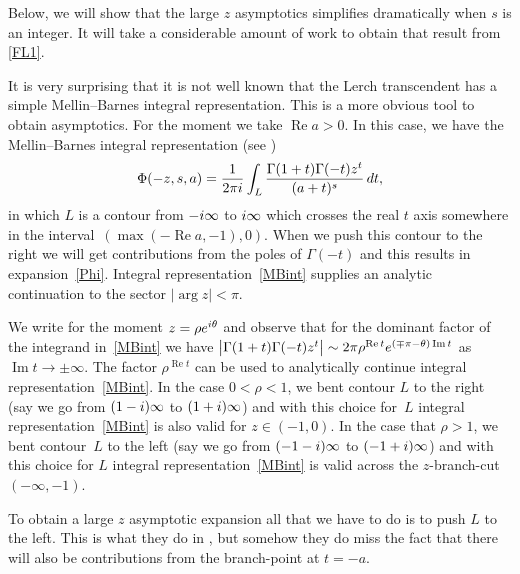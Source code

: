 \documentclass[11pt]{article}
\numberwithin{equation}{section}
\numberwithin{equation}{section}
\def\expe{{\rm e}}
\def\iunit{{\rm i}}
\def\id{\,{\rm d}}
\begin{document}
Below, we will show that the large $z$ asymptotics simplifies dramatically
when $s$ is an integer. It will take a considerable amount of work to
obtain that result from \eqref{FL1}.

It is very surprising that it is not well known that the Lerch transcendent has a simple
Mellin--Barnes integral representation. This is a more obvious tool to obtain asymptotics.
For the moment we take $\operatorname{Re} a>0$. In this case,
we have the Mellin--Barnes integral representation (see \cite[equation~(3.11)]{Srivastava2011})
\begin{equation}\label{MBint}
 \Phi(-z,s,a)=\frac1{2\pi\iunit}\int_L
 \frac{\Gamma(1+t)\Gamma(-t)z^t}{(a+t)^s}\id t,
\end{equation}
in which $L$ is a contour from $-\iunit\infty$ to $\iunit\infty$ which crosses the
real $t$ axis somewhere in the interval~$(\max(-\operatorname{Re} a,-1),0)$. When we push this contour to the
right we will get contributions from the poles of $\Gamma(-t)$ and this results in
expansion~\eqref{Phi}. Integral representation~\eqref{MBint} supplies an
analytic continuation to the sector $|\arg z|<\pi$.

We write for the moment $z=\rho\expe^{\iunit\theta}$ and observe that for the dominant factor
of the integrand in~\eqref{MBint} we have
$\bigl|\Gamma(1+t)\Gamma(-t)z^t\bigr|\sim 2\pi \rho^{\operatorname{Re} t}\expe^{(\mp\pi-\theta)\operatorname{Im} t}$
as $\operatorname{Im} t\to\pm\infty$. The factor $\rho^{\operatorname{Re} t}$ can be used to analytically continue
integral representation~\eqref{MBint}.
In the case $0<\rho<1$, we bent contour $L$ to the right (say we go from $(1-\iunit)\infty$
to $(1+\iunit)\infty$) and with this choice for~$L$ integral representation~\eqref{MBint} is also valid for $z\in(-1,0)$.
In the case that $\rho>1$, we bent contour~$L$ to the
left (say we go from $(-1-\iunit)\infty$ to $(-1+\iunit)\infty$) and
with this choice for $L$ integral representation~\eqref{MBint}
is valid across the $z$-branch-cut $(-\infty,-1)$.

To obtain a large $z$ asymptotic expansion all that we have to do is to push $L$ to the
left. This is what they do in \cite{Srivastava2011}, but somehow they do miss the fact
that there will also be contributions from the branch-point at $t=-a$.
\end{document}
